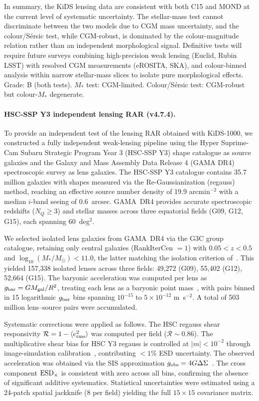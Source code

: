 \documentclass[11pt,a4paper]{article}
\newcommand{\e}[1]{\times 10^{#1}}
\newcommand{\gobs}{g_{\rm obs}}
\newcommand{\gbar}{g_{\rm bar}}
\begin{document}
In summary, the KiDS lensing data are consistent with both C15 and MOND at the current level of systematic
uncertainty. The stellar-mass test cannot discriminate between the two models due to CGM mass uncertainty,
and the colour/S\'ersic test, while CGM-robust, is dominated by the colour-magnitude relation rather than an
independent morphological signal. Definitive tests will require future surveys combining high-precision weak
lensing (Euclid, Rubin LSST) with resolved CGM measurements (eROSITA, SKA), and colour-binned analysis
within narrow stellar-mass slices to isolate pure morphological effects. Grade: B (both tests). $M_\ast$
test: CGM-limited. Colour/S\'ersic test: CGM-robust but colour-$M_\ast$ degenerate.

\paragraph{HSC-SSP Y3 independent lensing RAR (v4.7.4).}
To provide an independent test of the lensing RAR obtained with KiDS-1000, we constructed a fully
independent weak-lensing pipeline using the Hyper Suprime-Cam Subaru Strategic Program Year 3 (HSC-SSP Y3)
shape catalogue as source galaxies and the Galaxy and Mass Assembly Data Release 4 (GAMA DR4) spectroscopic
survey as lens galaxies. The HSC-SSP Y3 catalogue contains 35.7 million galaxies with shapes measured via
the Re-Gaussianization (regauss) method, reaching an effective source number density of 19.9 arcmin$^{-2}$
with a median $i$-band seeing of 0.6~arcsec. GAMA~DR4 provides accurate spectroscopic redshifts
($N_Q \ge 3$) and stellar masses across three equatorial fields (G09, G12, G15), each spanning 60~deg$^2$.

We selected isolated lens galaxies from GAMA~DR4 via the G3C group catalogue, retaining only central
galaxies (RankIterCen $= 1$) with $0.05 < z < 0.5$ and $\log_{10}(M_\ast/M_\odot) < 11.0$, the latter
matching the isolation criterion of~\citet{Brouwer2021}. This yielded 157{,}338 isolated lenses across three
fields: 49{,}272 (G09), 55{,}402 (G12), 52{,}664 (G15). The baryonic acceleration was computed per lens as
$\gbar = G M_{\rm gal}/R^2$, treating each lens as a baryonic point mass~\citep[][Eq.~2]{Brouwer2021}, with
pairs binned in 15 logarithmic $\gbar$ bins spanning $10^{-15}$ to $5\e{-12}$ m~s$^{-2}$. A total of 503
million lens--source pairs were accumulated.

Systematic corrections were applied as follows. The HSC regauss shear responsivity
$\mathcal{R} = 1 - \langle e_{\rm rms}^2 \rangle$ was computed per field ($\mathcal{R} \sim 0.86$). The
multiplicative shear bias for HSC Y3 regauss is controlled at $|m| < 10^{-2}$ through image-simulation
calibration~\citep{Li2022, Mandelbaum2018}, contributing $< 1\%$ ESD uncertainty. The observed acceleration
was obtained via the SIS approximation $\gobs = 4G\Delta\Sigma$~\citep[][Eq.~7]{Brouwer2021}. The cross
component ${\rm ESD}_\times$ is consistent with zero across all bins, confirming the absence of significant
additive systematics. Statistical uncertainties were estimated using a 24-patch spatial jackknife (8 per
field) yielding the full $15 \times 15$ covariance matrix.
\end{document}
